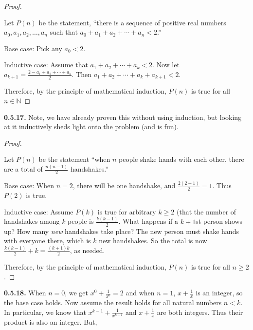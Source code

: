 \documentclass[12pt,]{book}
\theoremstyle{plain}
\theoremstyle{definition}
\theoremstyle{definition}
\theoremstyle{definition}
\numberwithin{equation}{chapter}
\newcommand{\N}{\mathbb N}
\newcommand{\lt}{<}
\begin{document}
\begin{proof}\hypertarget{proof-18}{}
\hypertarget{p-486}{}%
Let \(P(n)\) be the statement, ``there is a sequence of positive real numbers \(a_0, a_1, a_2, \ldots, a_n\) such that \(a_0 + a_1 + a_2 + \cdots + a_n \lt  2\).''%
\par
\hypertarget{p-487}{}%
Base case: Pick any \(a_0 \lt  2\).%
\par
\hypertarget{p-488}{}%
Inductive case: Assume that \(a_1 + a_2 + \cdots + a_k \lt  2\). Now let \(a_{k+1} = \frac{2- a_1 + a_2 + \cdots + a_k}{2}\). Then \(a_1 + a_2 + \cdots +a_k + a_{k+1} \lt  2\).%
\par
\hypertarget{p-489}{}%
Therefore, by the principle of mathematical induction, \(P(n)\) is true for all \(n \in \N\)%
\end{proof}
\par\smallskip
\noindent\textbf{0.5.17.} \hypertarget{p-491}{}%
Note, we have already proven this without using induction, but looking at it inductively sheds light onto the problem (and is fun).%
\begin{proof}\hypertarget{proof-19}{}
\hypertarget{p-492}{}%
Let \(P(n)\) be the statement ``when \(n\) people shake hands with each other, there are a total of \(\frac{n(n-1)}{2}\) handshakes.''%
\par
\hypertarget{p-493}{}%
Base case: When \(n=2\), there will be one handshake, and \(\frac{2(2-1)}{2} = 1\).  Thus \(P(2)\) is true.%
\par
\hypertarget{p-494}{}%
Inductive case: Assume \(P(k)\) is true for arbitrary \(k\ge 2\) (that the number of handshakes among \(k\) people is \(\frac{k(k-1)}{2}\).  What happens if a \(k+1\)st person shows up?  How many \emph{new} handshakes take place?  The new person must shake hands with everyone there, which is \(k\) new  handshakes.  So the total is now \(\frac{k(k-1)}{2} + k = \frac{(k+1)k}{2}\), as needed.%
\par
\hypertarget{p-495}{}%
Therefore, by the principle of mathematical induction, \(P(n)\) is true for all \(n \ge 2\).%
\end{proof}
\par\smallskip
\noindent\textbf{0.5.18.} \hypertarget{p-497}{}%
When \(n = 0\), we get \(x^0 +\frac{1}{x^0} = 2\) and when \(n = 1\), \(x + \frac{1}{x}\) is an integer, so the base case holds. Now assume the result holds for all natural numbers \(n \lt  k\). In particular, we know that \(x^{k-1} + \frac{1}{x^{k-1}}\) and \(x + \frac{1}{x}\) are both integers. Thus their product is also an integer. But,%
\end{document}

